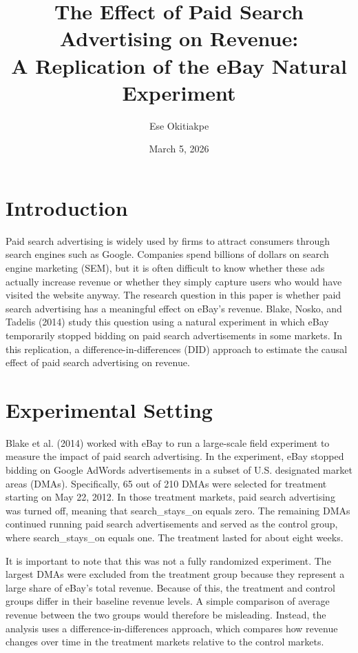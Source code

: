 \documentclass[12pt]{article}
\title{The Effect of Paid Search Advertising on Revenue: \\
A Replication of the eBay Natural Experiment}
\author{Ese Okitiakpe}
\date{March 5, 2026}
\begin{document}
\maketitle

\section{Introduction}

Paid search advertising is widely used by firms to attract consumers through search engines such as Google. Companies spend billions of dollars on search engine marketing (SEM), but it is often difficult to know whether these ads actually increase revenue or whether they simply capture users who would have visited the website anyway. The research question in this paper is whether paid search advertising has a meaningful effect on eBay’s revenue. Blake, Nosko, and Tadelis (2014) study this question using a natural experiment in which eBay temporarily stopped bidding on paid search advertisements in some markets. In this replication, a difference-in-differences (DID) approach to estimate the causal effect of paid search advertising on revenue.

\section{Experimental Setting}

Blake et al. (2014) worked with eBay to run a large-scale field experiment to measure the impact of paid search advertising. In the experiment, eBay stopped bidding on Google AdWords advertisements in a subset of U.S. designated market areas (DMAs). Specifically, 65 out of 210 DMAs were selected for treatment starting on May 22, 2012. In those treatment markets, paid search advertising was turned off, meaning that search\_stays\_on equals zero. The remaining DMAs continued running paid search advertisements and served as the control group, where search\_stays\_on equals one. The treatment lasted for about eight weeks.

It is important to note that this was not a fully randomized experiment. The largest DMAs were excluded from the treatment group because they represent a large share of eBay’s total revenue. Because of this, the treatment and control groups differ in their baseline revenue levels. A simple comparison of average revenue between the two groups would therefore be misleading. Instead, the analysis uses a difference-in-differences approach, which compares how revenue changes over time in the treatment markets relative to the control markets.
\end{document}
